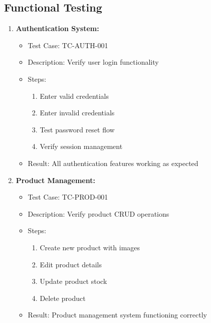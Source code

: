 \subsection{Functional Testing}
\begin{enumerate}
    \item \textbf{Authentication System:}
    \begin{itemize}
        \item Test Case: TC-AUTH-001
        \item Description: Verify user login functionality
        \item Steps:
        \begin{enumerate}
            \item Enter valid credentials
            \item Enter invalid credentials
            \item Test password reset flow
            \item Verify session management
        \end{enumerate}
        \item Result: All authentication features working as expected
    \end{itemize}

    \item \textbf{Product Management:}
    \begin{itemize}
        \item Test Case: TC-PROD-001
        \item Description: Verify product CRUD operations
        \item Steps:
        \begin{enumerate}
            \item Create new product with images
            \item Edit product details
            \item Update product stock
            \item Delete product
        \end{enumerate}
        \item Result: Product management system functioning correctly
    \end{itemize}


\end{enumerate}
